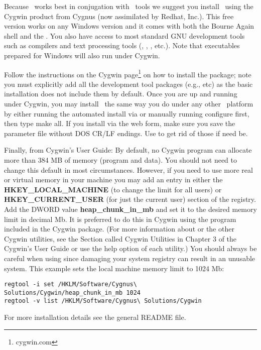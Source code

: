 Because \GMT\ works best in conjugation with \UNIX\ tools we
suggest you install \GMT\ using the Cygwin product from
Cygnus (now assimilated by Redhat, Inc.).  This free version works on any Windows version
and it comes with both the Bourne Again shell  and the .
You also have access to most standard GNU development tools such
as compilers and text processing tools (,
, , etc.).  Note that executables prepared for Windows
will also run under Cygwin.

Follow the instructions on the Cygwin page\footnote{cygwin.com} on how
to install the package; note you must explicitly add all the development tool
packages (e.g.,  etc) as the basic installation does not include them by default.
Once you are up and running under Cygwin, you may install \GMT\ 
the same way you do under any other \UNIX\ platform by either
running the automated install via  or manually
running configure first, then type make all.  If you install via the
web form, make sure you save the parameter file without DOS CR/LF
endings.  Use \progname{dos2unix} to get rid of those if need be.

Finally, from Cygwin's User Guide: By default, no Cygwin program
can allocate more than 384 MB of memory (program and data).
You should not need to change this default in most circumstances. However, if you need
to use more real or virtual memory in your machine you may add an entry in either the
\textbf{HKEY\_LOCAL\_MACHINE} (to change the limit for all users) or \textbf{HKEY\_CURRENT\_USER} (for just
the current user) section of the registry.  Add the DWORD value \textbf{heap\_chunk\_in\_mb} and set
it to the desired memory limit in decimal Mb.  It is preferred to do this in Cygwin
using the  program included in the Cygwin package. (For more information about
\progname{regtool} or the other Cygwin utilities, see the Section called Cygwin Utilities in
Chapter 3 of the Cygwin's User Guide or use the \-\-help option of each utility.) You should always be careful
when using \progname{regtool} since damaging your system registry can result in an unusable system.
This example sets the local machine memory limit to 1024 Mb:
\begin{verbatim}
regtool -i set /HKLM/Software/Cygnus\ Solutions/Cygwin/heap_chunk_in_mb 1024
regtool -v list /HKLM/Software/Cygnus\ Solutions/Cygwin
\end{verbatim}
For more installation details see the general README file.

